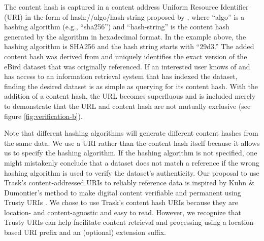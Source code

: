 The content hash is captured in a content address Uniform Resource Identifier (URI) \citep{rfc3986} in the form of hash://algo/hash-string proposed by \citep{Trask_2015}, where ``algo'' is a hashing algorithm (e.g., ``sha256'') and ``hash-string'' is the content hash generated by the algorithm in hexadecimal format. In the example above, the hashing algorithm is SHA256 and the hash string starts with ``29d3.'' The added content hash was derived from and uniquely identifies the exact version of the eBird dataset that was originally referenced. If an interested user knows of and has access to an information retrieval system that has indexed the dataset, finding the desired dataset is as simple as querying for its content hash. With the addition of a content hash, the URL becomes superfluous and is included merely to demonstrate that the URL and content hash are not mutually exclusive (see figure \ref{fig:verification-b}).

Note that different hashing algorithms will generate different content hashes from the same data. We use a URI rather than the content hash itself because it allows us to specify the hashing algorithm. If the hashing algorithm is not specified, one might mistakenly conclude that a dataset does not match a reference if the wrong hashing algorithm is used to verify the dataset's authenticity. Our proposal to use Trask's content-addressed URIs to reliably reference data is inspired by Kuhn \& Dumontier's method to make digital content verifiable and permanent using Trusty URIs \citep{Kuhn_2015}. We chose to use Trask's content hash URIs because they are location- and content-agnostic and easy to read. However, we recognize that Trusty URIs can help facilitate content retrieval and processing using a location-based URI prefix and an (optional) extension suffix.

